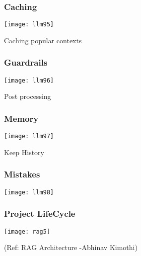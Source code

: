 \begin{frame}[fragile]\frametitle{Caching}


\begin{center}
\texttt{[image: llm95]}

\end{center}

Caching popular contexts
\end{frame}

\begin{frame}[fragile]\frametitle{Guardrails}


\begin{center}
\texttt{[image: llm96]}

\end{center}

Post processing
\end{frame}

\begin{frame}[fragile]\frametitle{Memory}


\begin{center}
\texttt{[image: llm97]}

\end{center}

Keep History
\end{frame}

\begin{frame}[fragile]\frametitle{Mistakes}


\begin{center}
\texttt{[image: llm98]}

\end{center}

\end{frame}

\begin{frame}[fragile]\frametitle{Project LifeCycle}


		\begin{center}
		\texttt{[image: rag5]}
		\end{center}

{\tiny (Ref: RAG Architecture -Abhinav  Kimothi)}

\end{frame}

